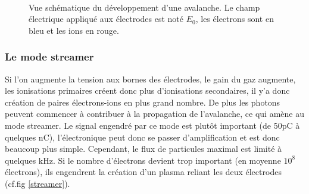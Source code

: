 \begin{figure}[ht!]
\centering
{}
\hfill
{}
\\
\hfill
{}
\caption{Vue schématique du développement d'une avalanche. Le champ électrique appliqué aux électrodes est noté $E_{0}$, les électrons sont en bleu et les ions en rouge.}
\label{avalanche}
\end{figure}

\subsubsection{Le mode streamer}
Si l'on augmente la tension aux bornes des électrodes, le gain du gaz augmente, les ionisations primaires créent donc plus d'ionisations secondaires, il y'a donc création de paires électrons-ions  en plus grand nombre. De plus les photons peuvent commencer à contribuer à la propagation de l'avalanche, ce qui amène au mode streamer. Le signal engendré par ce mode est plutôt important (de 50pC à quelques nC), l'électronique peut donc se passer d'amplification et est donc beaucoup plus simple. Cependant, le flux de particules maximal est limité à quelques \si{\kilo\hertz}. Si le nombre d'électrons devient trop important (en moyenne $10^{8}$ électrons), ils engendrent la création d'un plasma reliant les deux électrodes (cf.fig \ref{streamer}).

